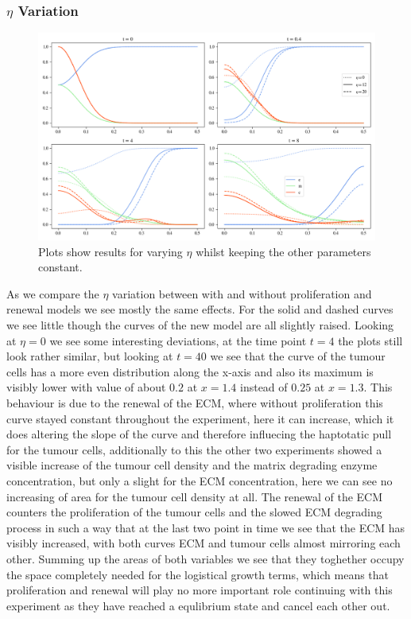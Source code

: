 \subsubsection*{$\eta$ Variation}
\begin{figure}[h]
    \centering
    \includegraphics[width=\textwidth]{resources/images/prolif_eta_variation.png}
    \caption{Plots show results for varying $\eta$ whilst keeping the other parameters constant.}
    \label{fig:prolif_eta_variation}
\end{figure}

As we compare the $\eta$ variation between with and without proliferation and renewal models we see mostly the same effects. For the solid and dashed curves we see little though the curves of the new model are all slightly raised. Looking at $\eta=0$ we see some interesting deviations, at the time point $t=4$ the plots still look rather similar, but looking at $t=40$ we see that the curve of the tumour cells has a more even distribution along the x-axis and also its maximum is visibly lower with value of about $0.2$ at $x=1.4$ instead of $0.25$ at $x=1.3$. This behaviour is due to the renewal of the ECM, where without proliferation this curve stayed constant throughout the experiment, here it can increase, which it does altering the slope of the curve and therefore influecing the haptotatic pull for the tumour cells, additionally to this the other two experiments showed a visible increase of the tumour cell density and the matrix degrading enzyme concentration, but only a slight for the ECM concentration, here we can see no increasing of area for the tumour cell density at all. The renewal of the ECM counters the proliferation of the tumour cells and the slowed ECM degrading process in such a way that at the last two point in time we see that the ECM has visibly increased, with both curves ECM and tumour cells almost mirroring each other. Summing up the areas of both variables we see that they toghether occupy the space completely needed for the logistical growth terms, which means that proliferation and renewal will play no more important role continuing with this experiment as they have reached a equlibrium state and cancel each other out. 



